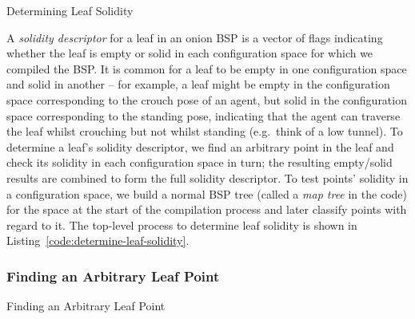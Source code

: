\documentclass[10pt,twocolumn]{article}
\begin{document}
\begin{stulisting}[!t]
\caption{Determining Leaf Solidity}
\label{code:determine-leaf-solidity}

\end{stulisting}

A \emph{solidity descriptor} for a leaf in an onion BSP is a vector of flags indicating whether the leaf is empty or solid in each configuration space for which we compiled the BSP. It is common for a leaf to be empty in one configuration space and solid in another -- for example, a leaf might be empty in the configuration space corresponding to the crouch pose of an agent, but solid in the configuration space corresponding to the standing pose, indicating that the agent can traverse the leaf whilst crouching but not whilst standing (e.g.~think of a low tunnel). To determine a leaf's solidity descriptor, we find an arbitrary point in the leaf and check its solidity in each configuration space in turn; the resulting empty/solid results are combined to form the full solidity descriptor. To test points' solidity in a configuration space, we build a normal BSP tree (called a \emph{map tree} in the code) for the space at the start of the compilation process and later classify points with regard to it. The top-level process to determine leaf solidity is shown in Listing~\ref{code:determine-leaf-solidity}.

\subsubsection{Finding an Arbitrary Leaf Point}

\afterpage{\clearpage}

\begin{stulisting}[!t]
\caption{Finding an Arbitrary Leaf Point}
\label{code:arbitrary-leaf-point}

\end{stulisting}
\end{document}
